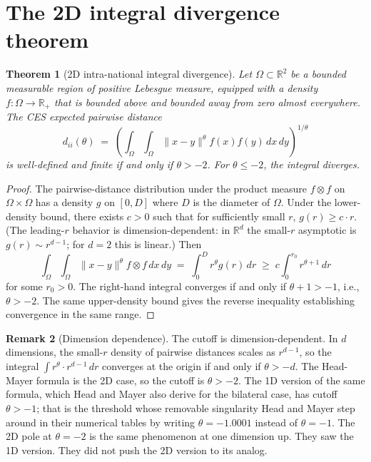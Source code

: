 \documentclass[11pt, letterpaper]{article}
\newtheorem{theorem}{Theorem}
\theoremstyle{definition}
\newtheorem{remark}[theorem]{Remark}
\newcommand{\R}{\mathbb{R}}
\newcommand{\dii}{d_{ii}}
\begin{document}
\section{The 2D integral divergence theorem}
\label{sec:divergence}

\begin{theorem}[2D intra-national integral divergence]
\label{thm:divergence}
Let $\Omega \subset \R^2$ be a bounded measurable region of positive
Lebesgue measure, equipped with a density $f: \Omega \to \R_+$
that is bounded above and bounded away from zero almost everywhere.
The CES expected pairwise distance
\begin{equation}
\dii(\theta) \;=\; \left( \int_\Omega \int_\Omega \|x - y\|^\theta f(x) f(y)\, dx\, dy \right)^{1/\theta}
\end{equation}
is well-defined and finite if and only if $\theta > -2$.
For $\theta \leq -2$, the integral diverges.
\end{theorem}

\begin{proof}
The pairwise-distance distribution under the product measure
$f \otimes f$ on $\Omega \times \Omega$ has a density $g$ on $[0, D]$
where $D$ is the diameter of $\Omega$. Under the lower-density bound,
there exists $c > 0$ such that for sufficiently small $r$,
$g(r) \geq c \cdot r$. (The leading-$r$ behavior is dimension-dependent:
in $\R^d$ the small-$r$ asymptotic is $g(r) \sim r^{d-1}$; for $d = 2$
this is linear.) Then
\begin{equation}
\int_\Omega \int_\Omega \|x - y\|^\theta f \otimes f\, dx\, dy
\;=\; \int_0^D r^\theta g(r)\, dr
\;\geq\; c \int_0^{r_0} r^{\theta + 1}\, dr
\end{equation}
for some $r_0 > 0$. The right-hand integral converges if and only if
$\theta + 1 > -1$, i.e., $\theta > -2$. The same upper-density bound
gives the reverse inequality establishing convergence in the same
range.
\end{proof}

\begin{remark}[Dimension dependence]
The cutoff is dimension-dependent. In $d$ dimensions, the small-$r$
density of pairwise distances scales as $r^{d-1}$, so the integral
$\int r^\theta \cdot r^{d-1}\, dr$ converges at the origin if and
only if $\theta > -d$. The Head-Mayer formula is the 2D case, so
the cutoff is $\theta > -2$. The 1D version of the same formula,
which Head and Mayer also derive for the bilateral case, has cutoff
$\theta > -1$; that is the threshold whose removable singularity
Head and Mayer step around in their numerical tables by writing
$\theta = -1.0001$ instead of $\theta = -1$. The 2D pole at
$\theta = -2$ is the same phenomenon at one dimension up. They saw
the 1D version. They did not push the 2D version to its analog.
\end{remark}
\end{document}
